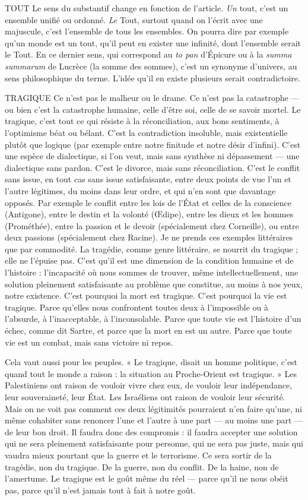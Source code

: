 TOUT Le sens du substantif change en fonction de l’article. {\it Un} tout, c’est
un ensemble unifié ou ordonné. {\it Le} Tout, surtout quand on l'écrit
avec une majuscule, c’est l’ensemble de tous les ensembles. On pourra dire par
exemple qu’un monde est un tout, qu’il peut en exister une infinité, dont
l’ensemble serait le Tout. En ce dernier sens, qui correspond au {\it to pan} d’Épicure
ou à la {\it summa summarum} de Lucrèce (la somme des sommes), c’est un
synonyme d’univers, au sens philosophique du terme. L'idée qu’il en existe plusieurs
serait contradictoire.

TRAGIQUE Ce n’est pas le malheur ou le drame. Ce n’est pas la catastrophe
— ou bien c’est la catastrophe humaine, celle d’être soi, celle de
se savoir mortel. Le tragique, c’est tout ce qui résiste à la réconciliation, aux
bons sentiments, à l’optimisme béat ou bélant. C’est la contradiction insoluble,
mais existentielle plutôt que logique (par exemple entre notre finitude et notre
désir d’infini). C’est une espèce de dialectique, si l’on veut, mais sans synthèse
ni dépassement — une dialectique sans pardon. C’est le divorce, mais sans
réconciliation. C’est le conflit sans issue, en tout cas sans issue satisfaisante,
entre deux points de vue l’un et l’autre légitimes, du moins dans leur ordre, et
qui n’en sont que davantage opposés. Par exemple le conflit entre les lois de
l’État et celles de la conscience (Antigone), entre le destin et la volonté
(Œdipe), entre les dieux et les hommes (Prométhée), entre la passion et le
devoir (spécialement chez Corneille), ou entre deux passions (spécialement
chez Racine). Je ne prends ces exemples littéraires que par commodité. La
tragédie, comme genre littéraire, se nourrit du tragique ; elle ne l’épuise pas.
C’est qu’il est une dimension de la condition humaine et de l’histoire : l’incapacité
où nous sommes de trouver, même intellectuellement, une solution pleinement
satisfaisante au problème que constitue, au moins à nos yeux, notre
existence. C’est pourquoi la mort est tragique. C’est pourquoi la vie est tragique.
Parce qu'elles nous confrontent toutes deux à l'impossible ou à
l'absurde, à l’inacceptable, à l’inconsolable. Parce que toute vie est l’histoire
d’un échec, comme dit Sartre, et parce que la mort en est un autre. Parce que
toute vie est un combat, mais sans victoire ni repos.

Cela vaut aussi pour les peuples. « Le tragique, disait un homme politique,
c’est quand tout le monde a raison : la situation au Proche-Orient est
tragique. » Les Palestiniens ont raison de vouloir vivre chez eux, de vouloir
leur indépendance, leur souveraineté, leur État. Les Israéliens ont raison de
vouloir leur sécurité. Mais on ne voit pas comment ces deux légitimités pourraient
n’en faire qu’une, ni même cohabiter sans renoncer l’une et l’autre à
une part — au moins une part — de leur bon droit. Il faudra donc des
compromis : il faudra accepter une solution qui ne sera pleinement satisfaisante
pour personne, qui ne sera pas juste, mais qui vaudra mieux pourtant
que la guerre et le terrorisme. Ce sera sortir de la tragédie, non du tragique.
De la guerre, non du conflit. De la haine, non de l’amertume. Le tragique est
le goût même du réel — parce qu’il ne nous obéit pas, parce qu’il n’est jamais
tout à fait à notre goût.

